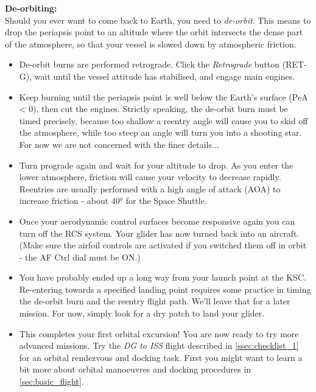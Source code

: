 \documentclass[Orbiter User Manual.tex]{subfiles}
\begin{document}
\noindent
\begin{figure}[H]
	\centering
\end{figure}

\noindent
\textbf{De-orbiting:}\\
Should you ever want to come back to Earth, you need to \textit{de-orbit}. This means to drop the periapsis point to an altitude where the orbit intersects the dense part of the atmosphere, so that your vessel is slowed down by atmospheric friction.

\begin{itemize}
\item De-orbit burns are performed retrograde. Click the \textit{Retrograde} button (RET-G), wait until the vessel attitude has stabilised, and engage main engines.
\item Keep burning until the periapsis point is well below the Earth's surface (PeA < 0), then cut the engines. Strictly speaking, the de-orbit burn must be timed precisely, because too shallow a reentry angle will cause you to skid off the atmosphere, while too steep an angle will turn you into a shooting star. For now we are not concerned with the finer details...
\item Turn prograde again and wait for your altitude to drop. As you enter the lower atmosphere, friction will cause your velocity to decrease rapidly. Reentries are usually performed with a high angle of attack (AOA) to increase friction - about 40° for the Space Shuttle.
\item Once your aerodynamic control surfaces become responsive again you can turn off the RCS system. Your glider has now turned back into an aircraft. (Make sure the airfoil controls are activated if you switched them off in orbit - the AF Ctrl dial must be ON.)
\item You have probably ended up a long way from your launch point at the KSC. Re-entering towards a specified landing point requires some practice in timing the de-orbit burn and the reentry flight path. We'll leave that for a later mission. For now, simply look for a dry patch to land your glider.
\item This completes your first orbital excursion!
You are now ready to try more advanced missions. Try the \textit{DG to ISS} flight described in \ref{ssec:checklist_1} for an orbital rendezvous and docking task. First you might want to learn a bit more about orbital manoeuvres and docking procedures in \ref{sec:basic_flight}.
\end{itemize}
\end{document}
